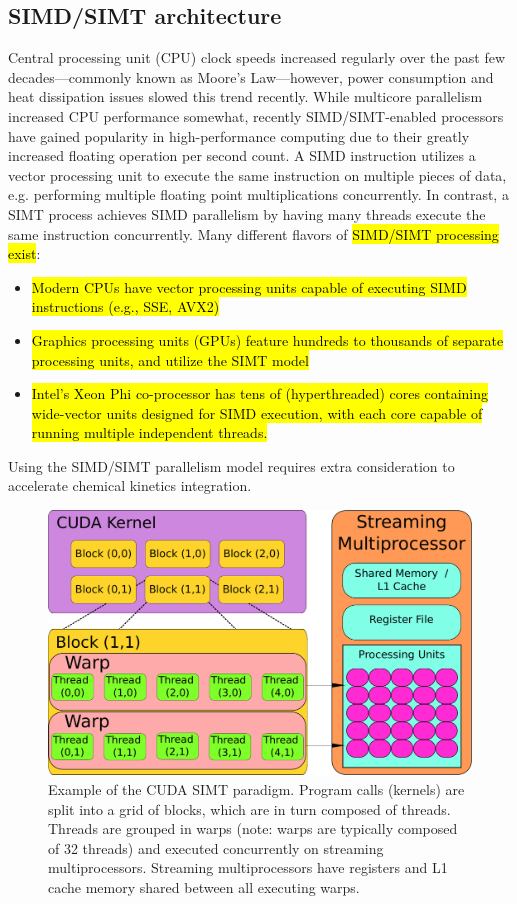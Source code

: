\documentclass[preprint,review,11pt]{elsarticle}
\DeclareRobustCommand{\hlb}[1]{\sethlcolor{SkyBlue}\hl{#1}}
\begin{document}
\subsection{SIMD\slash SIMT architecture}

Central processing unit (CPU) clock speeds increased regularly over the past few decades---commonly known as Moore's Law---however, power consumption and heat dissipation issues slowed this trend recently.
While multicore parallelism increased CPU performance somewhat, recently SIMD\slash SIMT-enabled processors have gained popularity in high-performance computing due to their greatly increased floating operation per second count.
A SIMD instruction utilizes a vector processing unit to execute the same instruction on multiple pieces of data, e.g. performing multiple floating point multiplications concurrently.
In contrast, a SIMT process achieves SIMD parallelism by having many threads execute the same instruction concurrently.
Many different flavors of \hlb{SIMD\slash SIMT processing exist}:
\begin{itemize}
 \item \hlb{Modern CPUs have vector processing units capable of executing SIMD instructions (e.g., SSE, AVX2)}
 \item \hlb{Graphics processing units (GPUs) feature hundreds to thousands of separate processing units, and utilize the SIMT model}
 \item \hlb{Intel's Xeon Phi co-processor has tens of (hyperthreaded) cores containing wide-vector units designed for SIMD execution, with each core capable of running multiple independent threads.}
\end{itemize}
Using the SIMD\slash SIMT parallelism model requires extra consideration to accelerate chemical kinetics integration.

\begin{figure}[htbp]
  \centering
  \includegraphics[width=0.5\linewidth]{cuda_paradigm.pdf}
  \caption{Example of the CUDA SIMT paradigm.
  Program calls (kernels) are split into a grid of blocks, which are in turn composed of threads.
  Threads are grouped in warps (note: warps are typically composed of 32 threads) and executed concurrently on streaming multiprocessors.
  Streaming multiprocessors have registers and L1 cache memory shared between all executing warps.}
  \label{F:cuda}
\end{figure}
\end{document}
